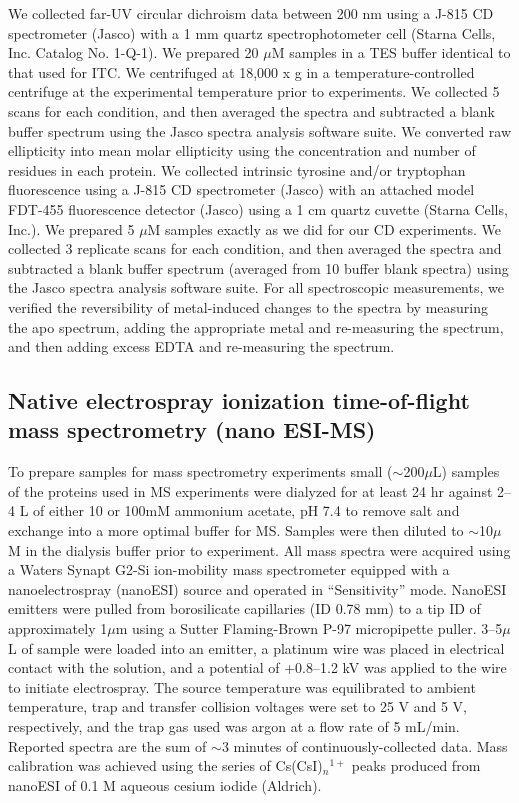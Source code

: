 We collected far-UV circular dichroism data between 200
nm using a J-815 CD spectrometer (Jasco) with a 1 mm quartz spectrophotometer
cell (Starna Cells, Inc. Catalog No. 1-Q-1). We prepared 20
$\mu$M samples in a TES buffer identical to that used for ITC. We
centrifuged at 18,000 x g in a temperature-controlled centrifuge at
the experimental temperature prior to experiments. We collected 5
scans for each condition, and then averaged the spectra and subtracted
a blank buffer spectrum using the Jasco spectra analysis software
suite. We converted raw ellipticity into mean molar ellipticity using
the concentration and number of residues in each protein. We collected
intrinsic tyrosine and/or tryptophan fluorescence using a J-815 CD
spectrometer (Jasco) with an attached model FDT-455 fluorescence detector
(Jasco) using a 1 cm quartz cuvette (Starna Cells, Inc.). We prepared
5 $\mu$M samples exactly as we did for our CD experiments.
We collected 3 replicate scans for each condition, and
then averaged the spectra and subtracted a blank buffer spectrum (averaged
from 10 buffer blank spectra) using the Jasco spectra
analysis software suite. For all spectroscopic measurements, we verified
the reversibility of metal-induced changes to the spectra by measuring
the apo spectrum, adding the appropriate metal and re-measuring the
spectrum, and then adding excess EDTA and re-measuring the spectrum.

\subsection{Native electrospray ionization time-of-flight mass spectrometry (nano ESI-MS)}

To prepare samples for mass spectrometry experiments small ($\sim$200$\mu$L) samples of the proteins used in MS experiments were dialyzed for at least 24 hr against 2--4 L of either 10 or 100mM ammonium acetate, pH 7.4 to remove salt and exchange into a more optimal buffer for MS. Samples were then diluted to $\sim$10$\mu$M in the dialysis buffer prior to experiment. All mass spectra were acquired using a Waters Synapt G2-Si ion-mobility mass spectrometer equipped with a nanoelectrospray (nanoESI) source and operated in “Sensitivity” mode. NanoESI emitters were pulled from borosilicate capillaries (ID 0.78 mm) to a tip ID of approximately 1$\mu$m using a Sutter Flaming-Brown P-97 micropipette puller. 3--5$\mu$L of sample were loaded into an emitter, a platinum wire was placed in electrical contact with the solution, and a potential of +0.8--1.2 kV was applied to the wire to initiate electrospray. The source temperature was equilibrated to ambient temperature, trap and transfer collision voltages were set to 25 V and 5 V, respectively, and the trap gas used was argon at a flow rate of 5 mL/min. Reported spectra are the sum of $\sim$3 minutes of continuously-collected data. Mass calibration was achieved using the series of Cs(CsI)$_{n}$$^{1+}$ peaks produced from nanoESI of 0.1 M aqueous cesium iodide (Aldrich).

